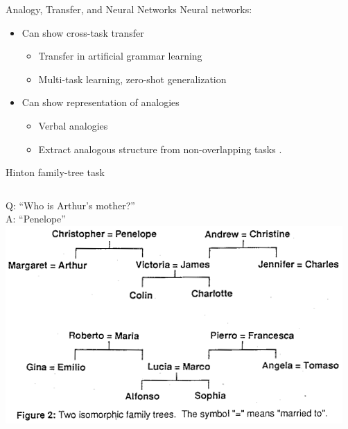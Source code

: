 \documentclass{beamer}
\begin{document}
\begin{frame}{Analogy, Transfer, and Neural Networks}
Neural networks:
\begin{itemize}[<+->]
    \item Can show cross-task transfer
    \begin{itemize}
	\item Transfer in artificial grammar learning \cite{Dienes1999}
	\item Multi-task learning, zero-shot generalization \cite{Luong2016,Johnson2016}  
    \end{itemize}
    \item Can show representation of analogies
    \begin{itemize}
	\item Verbal analogies \cite{Kollias2013}
	\item Extract analogous structure from non-overlapping tasks \cite{Hinton1986}.
    \end{itemize}
\end{itemize}
\end{frame}

\begin{frame}{Hinton family-tree task}
\begin{columns}
 Q: ``Who is Arthur's mother?'' \\ A: ``Penelope'' %
    \includegraphics[width = \textwidth]{../writing/cogsci_2017/figures/hinton_family_tree_figure.png}
\end{columns}
\end{frame}
\end{document}
